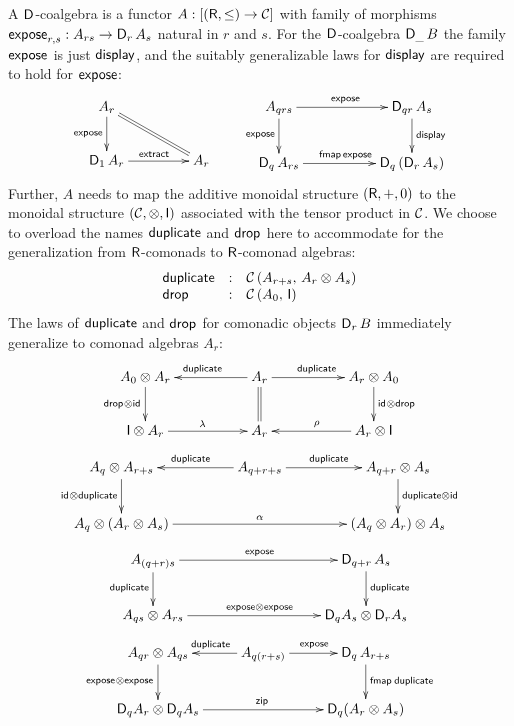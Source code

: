 \documentclass[acmsmall,review,anonymous]{acmart}\settopmatter{printfolios=true,printccs=false,printacmref=false}
\theoremstyle{remark}
\begin{document}
A $\D$-coalgebra is a functor $A : [(\R,\leq) \to \CC]$ with family of
morphisms $\expose[r,s] : A_{rs} \to \D[r]\,A_s$ natural in $r$ and
$s$.  For the $\D$-coalgebra $\D[\_]\,B$ the family $\expose$ is just
$\tdisplay$, and the suitably generalizable laws for $\tdisplay$ are
required to hold for $\texpose$:
\[
\xymatrix@C=10ex{
A_r  \ar[d]_{\texpose} \ar@{=}[dr]
\\
\D[1]\,A_r \ar[r]^{\textract}
  & A_r
}
\qquad
\xymatrix@C=12ex{
A_{qrs} \ar[d]_{\texpose} \ar[r]^{\texpose}
  & \D[qr]\,A_s \ar[d]^{\tdisplay}
\\
\D[q]\,A_{rs} \ar[r]^{\tfmap\,\texpose}
  & \D[q]\,(\D[r]\,A_s)
}
\]
Further, $A$ needs to map the additive monoidal structure $(\R,+,0)$
to the monoidal structure $(\CC,\otimes,\I)$ associated with the
tensor product in $\CC$.  We choose to overload the names
$\tduplicate$ and $\tdrop$ here to accommodate for the generalization
from $\R$-comonads to $\R$-comonad algebras:
\[
\begin{array}{lcl}
  \tduplicate & : & \Hom {A_{r+s}} {A_r \otimes A_s} \\
  \tdrop      & : & \Hom {A_0} {\I} \\
\end{array}
\]
The laws of $\tduplicate$ and $\tdrop$ for comonadic objects
$\D[r]\,B$ immediately generalize to comonad algebras $A_r$:
\[
\xymatrix@C=12ex{
A_{0} \otimes A_r \ar[d]_{\tdrop \otimes \tid}
& A_r \ar[l]_{\tduplicate} \ar[r]^{\tduplicate} \ar@{=}[d]
& A_r \otimes A_{0} \ar[d]^{\tid \otimes \tdrop}
\\
\I \otimes A_r \ar[r]^{\Gl}
& A_r
& A_r \otimes \I \ar[l]_{\Gr}
}
\]
\[
\xymatrix@C=10ex{
A_q \otimes A_{r+s}  \ar[d]_{\tid \otimes \tduplicate}
& A_{q+r+s} \ar[l]_{\tduplicate} \ar[r]^{\tduplicate}
& A_{q+r} \otimes A_s \ar[d]^{\tduplicate \otimes \tid}
\\
A_q \otimes (A_r \otimes A_s) \ar[rr]^{\Ga}
& & (A_q \otimes A_r) \otimes A_s
}
\]
\[
\xymatrix@C=22ex{
A_{(q+r)s} \ar[r]^{\texpose} \ar[d]_{\tduplicate}
& \D[q+r]\,A_s \ar[d]^{\tduplicate}
\\
A_{qs} \otimes A_{rs} \ar[r]^{\texpose \otimes \texpose}
& \D[q]A_s \otimes \D[r]A_s
}
\]
\[
\xymatrix{
A_{qr} \otimes A_{qs} \ar[d]_{\expose \otimes \expose}
  & A_{q(r+s)} \ar[l]_{\tduplicate} \ar[r]^{\expose}
  & \D[q]\,A_{r+s} \ar[d]^{\fmap\tduplicate}
\\
\D[q]A_r \otimes \D[q]A_s \ar[rr]^{\tzip}
&&
\D[q](A_r \otimes A_s)
}
\]
\end{document}
